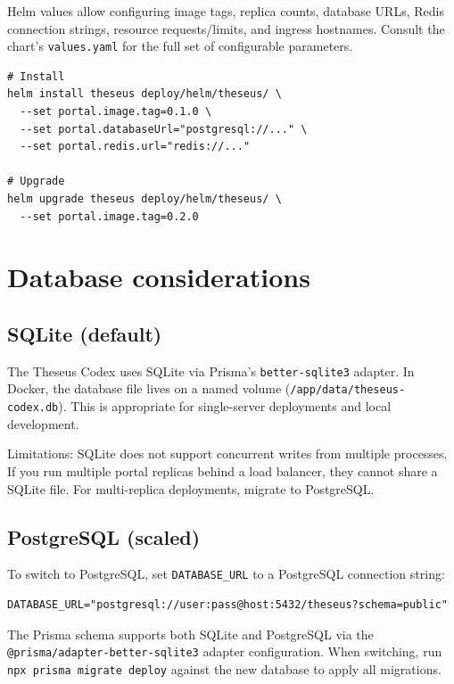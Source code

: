 \documentclass[11pt,letterpaper]{article}
\newcommand{\file}[1]{\texttt{#1}}
\newcommand{\cmd}[1]{\texttt{#1}}
\begin{document}
Helm values allow configuring image tags, replica counts, database URLs, Redis connection strings, resource requests/limits, and ingress hostnames. Consult the chart's \file{values.yaml} for the full set of configurable parameters.

\begin{lstlisting}
# Install
helm install theseus deploy/helm/theseus/ \
  --set portal.image.tag=0.1.0 \
  --set portal.databaseUrl="postgresql://..." \
  --set portal.redis.url="redis://..."

# Upgrade
helm upgrade theseus deploy/helm/theseus/ \
  --set portal.image.tag=0.2.0
\end{lstlisting}

\section{Database considerations}

\subsection{SQLite (default)}

The Theseus Codex uses SQLite via Prisma's \cmd{better-sqlite3} adapter. In Docker, the database file lives on a named volume (\file{/app/data/theseus-codex.db}). This is appropriate for single-server deployments and local development.

Limitations: SQLite does not support concurrent writes from multiple processes. If you run multiple portal replicas behind a load balancer, they cannot share a SQLite file. For multi-replica deployments, migrate to PostgreSQL.

\subsection{PostgreSQL (scaled)}

To switch to PostgreSQL, set \cmd{DATABASE\_URL} to a PostgreSQL connection string:

\begin{lstlisting}
DATABASE_URL="postgresql://user:pass@host:5432/theseus?schema=public"
\end{lstlisting}

The Prisma schema supports both SQLite and PostgreSQL via the \cmd{@prisma/adapter-better-sqlite3} adapter configuration. When switching, run \cmd{npx prisma migrate deploy} against the new database to apply all migrations.
\end{document}
